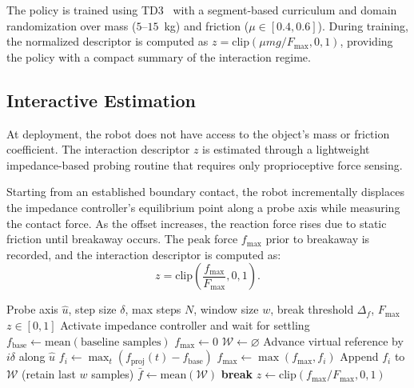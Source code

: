 The policy is trained using TD3~\citep{fujimoto2018td3} with a segment-based curriculum and domain randomization over mass ($5$--$15$~kg) and friction ($\mu \in [0.4, 0.6]$). During training, the normalized descriptor is computed as $z = \text{clip}(\mu m g / F_\text{max}, 0, 1)$, providing the policy with a compact summary of the interaction regime.


\subsection{Interactive Estimation}
\label{sec:pho_estimation}

At deployment, the robot does not have access to the object's mass or friction coefficient. The interaction descriptor $z$ is estimated through a lightweight impedance-based probing routine that requires only proprioceptive force sensing.

Starting from an established boundary contact, the robot incrementally displaces the impedance controller's equilibrium point along a probe axis while measuring the contact force. As the offset increases, the reaction force rises due to static friction until breakaway occurs. The peak force $f_\text{max}$ prior to breakaway is recorded, and the interaction descriptor is computed as:
\[
z = \text{clip}\left(\frac{f_\text{max}}{F_\text{max}}, 0, 1\right).
\]

\begin{algorithm}[t]
\vspace*{0.2cm}
\footnotesize
\caption{Reactive force estimation via impedance probing.}
\label{alg:force_probe}
\begin{algorithmic}[1]
\REQUIRE Probe axis $\hat{u}$, step size $\delta$, max steps $N$, window size $w$, break threshold $\Delta_f$, $F_{\max}$
\ENSURE $z \in [0,1]$
\STATE Activate impedance controller and wait for settling
\STATE $f_{\text{base}} \gets \mathrm{mean}(\text{baseline samples})$
\STATE $f_{\max} \gets 0$
\STATE $\mathcal{W} \gets \varnothing$
    \STATE Advance virtual reference by $i\delta$ along $\hat{u}$
    \STATE $f_i \gets \max_t (f_{\text{proj}}(t) - f_{\text{base}})$
    \STATE $f_{\max} \gets \max(f_{\max}, f_i)$
    \STATE Append $f_i$ to $\mathcal{W}$ (retain last $w$ samples)
        \STATE $\bar{f} \gets \mathrm{mean}(\mathcal{W})$
            \STATE \textbf{break} 
        \ENDIF
    \ENDIF
\ENDFOR
\STATE \RETURN $z \gets \mathrm{clip}(f_{\max}/F_{\max}, 0, 1)$
\end{algorithmic}
\end{algorithm}

